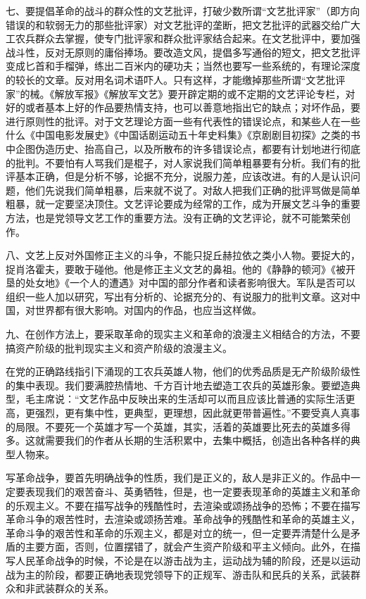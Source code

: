 七、要提倡革命的战斗的群众性的文艺批评，打破少数所谓“文艺批评家”（即方向错误的和软弱无力的那些批评家）对文艺批评的垄断，把文艺批评的武器交给广大工农兵群众去掌握，使专门批评家和群众批评家结合起来。在文艺批评中，要加强战斗性，反对无原则的庸俗捧场。要改造文风，提倡多写通俗的短文，把文艺批评变成匕首和手榴弹，练出二百米内的硬功夫；当然也要写一些系统的，有理论深度的较长的文章。反对用名词术语吓人。只有这样，才能缴掉那些所谓“文艺批评家”的械。《解放军报》《解放军文艺》要开辟定期的或不定期的文艺评论专栏，对好的或者基本上好的作品要热情支持，也可以善意地指出它的缺点；对坏作品，要进行原则性的批评。对于文艺理论方面一些有代表性的错误论点，和某些人在一些什么《中国电影发展史》《中国话剧运动五十年史料集》《京剧剧目初探》之类的书中企图伪造历史、抬高自己，以及所散布的许多错误论点，都要有计划地进行彻底的批判。不要怕有人骂我们是棍子，对人家说我们简单粗暴要有分析。我们有的批评基本正确，但是分析不够，论据不充分，说服力差，应该改进。有的人是认识问题，他们先说我们简单粗暴，后来就不说了。对敌人把我们正确的批评骂做是简单粗暴，就一定要坚决顶住。文艺评论要成为经常的工作，成为开展文艺斗争的重要方法，也是党领导文艺工作的重要方法。没有正确的文艺评论，就不可能繁荣创作。

八、文艺上反对外国修正主义的斗争，不能只捉丘赫拉依之类小人物。要捉大的，捉肖洛霍夫，要敢于碰他。他是修正主义文艺的鼻祖。他的《静静的顿河》《被开垦的处女地》《一个人的遭遇》对中国的部分作者和读者影响很大。军队是否可以组织一些人加以研究，写出有分析的、论据充分的、有说服力的批判文章。这对中国，对世界都有很大影响。对国内的作品，也应当这样做。

九、在创作方法上，要采取革命的现实主义和革命的浪漫主义相结合的方法，不要搞资产阶级的批判现实主义和资产阶级的浪漫主义。

在党的正确路线指引下涌现的工农兵英雄人物，他们的优秀品质是无产阶级阶级性的集中表现。我们要满腔热情地、千方百计地去塑造工农兵的英雄形象。要塑造典型，毛主席说：“文艺作品中反映出来的生活却可以而且应该比普通的实际生活更高，更强烈，更有集中性，更典型，更理想，因此就更带普遍性。”不要受真人真事的局限。不要死一个英雄才写一个英雄，其实，活着的英雄要比死去的英雄多得多。这就需要我们的作者从长期的生活积累中，去集中概括，创造出各种各样的典型人物来。

写革命战争，要首先明确战争的性质，我们是正义的，敌人是非正义的。作品中一定要表现我们的艰苦奋斗、英勇牺牲，但是，也一定要表现革命的英雄主义和革命的乐观主义。不要在描写战争的残酷性时，去渲染或颂扬战争的恐怖；不要在描写革命斗争的艰苦性时，去渲染或颂扬苦难。革命战争的残酷性和革命的英雄主义，革命斗争的艰苦性和革命的乐观主义，都是对立的统一，但一定要弄清楚什么是矛盾的主要方面，否则，位置摆错了，就会产生资产阶级和平主义倾向。此外，在描写人民革命战争的时候，不论是在以游击战为主，运动战为辅的阶段，还是以运动战为主的阶段，都要正确地表现党领导下的正规军、游击队和民兵的关系，武装群众和非武装群众的关系。

